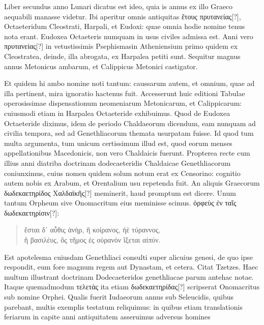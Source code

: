 Liber secundus anno Lunari dicatus est ideo, quia is annus ex illo
Graeco aequabili manasse videtur.
Ibi aperitur omnis antiquitas \textgreek{ἔτους
πρυτανείας[?]}, Octaeteridum Cleostrati, Harpali, et Eudoxi: quae omnia
hodie nomine tenus nota erant.
Eudoxea Octaeteris numquam
in usus civiles admissa est.
Anni vero \textgreek{πρυτανείας[?]} in vetustissimis Psephismasin
Atheniensium primo quidem ex Cleostratea, deinde, illa
abrogata, ex Harpalea petiti sunt.
Sequitur magnus annus Metonicus
ambarum, et Calippicus Metonici castigator.

Et quidem hi
ambo nomine noti tantum: caussarum autem, et omnium, quae ad
illa pertinent, mira ignoratio hactenus fuit.
Accesserunt huic editioni
Tabulae operosissimae dispensationum neomeniarum Metonicarum,
et Calippicarum: cuiusmodi etiam in Harpalea Octaeteride
exhibuimus. 
Quod de Eudoxea Octaeteride diximus, idem de
periodo Chaldaeorum dicendum, eam nunquam ad civilia tempora,
sed ad Genethliacorum themata usurpatam fuisse.
Id quod tum
multa argumenta, tum unicum certissimum illud est, quod eorum
menses appellationibus Macedonicis, non vero Chaldaicis fuerunt.
Propterea recte cum illius anni diatriba doctrinam dodecaeteridis
Chaldaicae Genethliacorum coniunximus, cuius nomen quidem
solum notum erat ex Censorino: cognitio autem nobis ex Arabum,
et Orentalium usu repetenda fuit.
An aliquis Graecorum \textgreek{δωδεκαετηρίδος Χαλδαϊκῆς[?]}
meminerit, haud promptum est dicere.
Unum tantum Orpheum sive Onomacritum eius meminisse scimus. 
\textgreek{ὀρφεὺς ἐν ταῖς δωδεκαετηρίσιν[?]:}
\begin{verse}
\textgreek{ἔσται δ᾽ αὖθις ἀνὴρ, ἢ κοίρανος, ἠὲ τύραννος,\\
ἢ βασιλὲυς, ὂς τῆμος ἐς οὐρανὸν ἴξεται αἰπύν}.
\end{verse}
Est apotelesma cuiusdam Genethliaci consulti super alicuius genesi,
de quo ipse respondit, eum fore magnum regem aut Dynastam, et cetera.
Citat Tzetzes. 
Haec multum illustrant doctrinam Dodecaeteridos
genethliacae parum antehac notae.
Itaque quemadmodum \textgreek{τελετὰς}
ita etiam \textgreek{δωδεκαετηρίδας[?]} scripserat Onomacritus sub nomine
Orphei.
Qualis fuerit Iudaeorum annus sub Seleucidis, quibus parebant,
multis exemplis testatum reliquimus: in quibus etiam translationis
feriarum in capite anni antiquitatem asseruimus adversus homines
